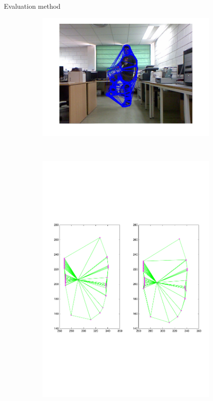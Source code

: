 \begin{frame}{Evaluation method}
\begin{itemize}
{\begin{figure}
\begin{subfigure}[b]{0.3\textwidth}
                \includegraphics[width=\textwidth, trim=0 0 0 0,clip]{fig21.jpg}
        \end{subfigure}%
	 ~
        \begin{subfigure}[b]{0.3\textwidth}
                \centering
                \includegraphics[width=\textwidth, trim=40 230 30 220,clip]{fig22.pdf}

\end{subfigure}
\end{figure}}
\end{itemize}
\end{frame}

